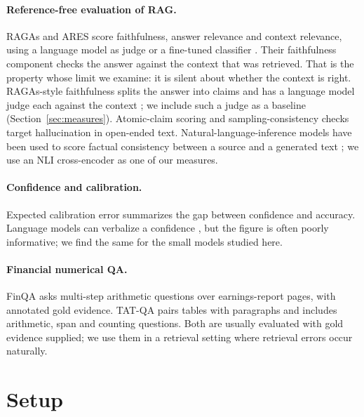 \paragraph{Reference-free evaluation of RAG.}
RAGAs and ARES score faithfulness, answer relevance and context relevance, using a language model as judge or a fine-tuned classifier \citep{es2024ragas,saadfalcon2024ares}.
Their faithfulness component checks the answer against the context that was retrieved.
That is the property whose limit we examine: it is silent about whether the context is right.
RAGAs-style faithfulness splits the answer into claims and has a language model judge each against the context \citep{es2024ragas,zheng2023judging}; we include such a judge as a baseline (Section~\ref{sec:measures}).
Atomic-claim scoring \citep{min2023factscore} and sampling-consistency checks \citep{manakul2023selfcheckgpt} target hallucination in open-ended text.
Natural-language-inference models have been used to score factual consistency between a source and a generated text \citep{maynez2020faithfulness,laban2022summac,zha2023alignscore}; we use an NLI cross-encoder as one of our measures.

\paragraph{Confidence and calibration.}
Expected calibration error \citep{guo2017calibration} summarizes the gap between confidence and accuracy.
Language models can verbalize a confidence \citep{kadavath2022know,xiong2024confidence}, but the figure is often poorly informative; we find the same for the small models studied here.

\paragraph{Financial numerical QA.}
FinQA \citep{chen2021finqa} asks multi-step arithmetic questions over earnings-report pages, with annotated gold evidence.
TAT-QA \citep{zhu2021tatqa} pairs tables with paragraphs and includes arithmetic, span and counting questions.
Both are usually evaluated with gold evidence supplied; we use them in a retrieval setting \citep{lewis2020rag} where retrieval errors occur naturally.

\section{Setup}
\label{sec:setup}

